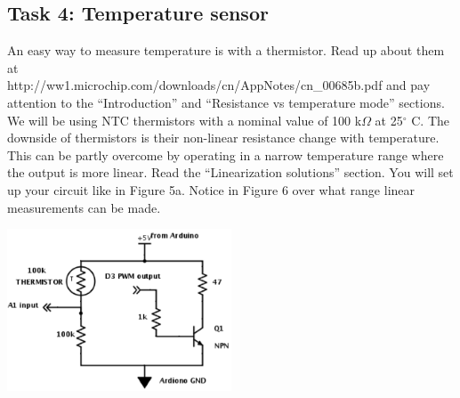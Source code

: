 \documentclass[12pt]{article}
\begin{document}
\subsection*{Task 4: Temperature sensor}

An easy way to measure temperature is with a thermistor. 
Read up about them at\\
http://ww1.microchip.com/downloads/cn/AppNotes/cn\_00685b.pdf  
and pay attention to the ``Introduction'' and ``Resistance vs temperature mode'' sections. 
We will be using NTC thermistors with a nominal value of 100 k$\Omega$ at 25$^{\circ}$ C. 
The downside of thermistors is their non-linear resistance change with temperature. 
This can be partly overcome by operating in a narrow temperature range where the output is more linear. 
Read the ``Linearization solutions'' section. 
You will set up your circuit like in Figure 5a.
Notice in Figure 6 over what range linear measurements can be made.

\begin{center}
\includegraphics[width=0.5\textwidth,trim=0 0 0 0,clip=false]{thermistorcircuit.png}
\end{center}
\end{document}
